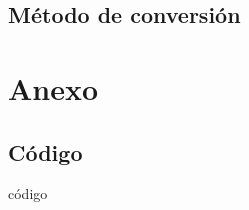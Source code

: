 \documentclass[a4paper,12pt]{article}
\begin{document}
\subsection{Método de conversión}

\newpage
\appendix 
\section{Anexo}
\subsection{Código} \label{codigo}
código



\printbibliography[
heading=bibintoc
]
\end{document}
